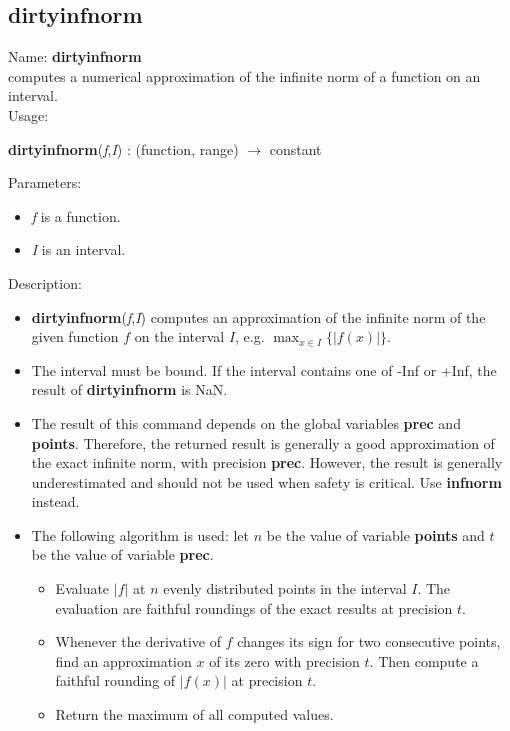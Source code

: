 \subsection{ dirtyinfnorm }
\noindent Name: \textbf{dirtyinfnorm}\\
computes a numerical approximation of the infinite norm of a function on an interval.\\

\noindent Usage: 
\begin{center}
\textbf{dirtyinfnorm}(\emph{f},\emph{I}) : (\textsf{function}, \textsf{range}) $\rightarrow$ \textsf{constant}\\
\end{center}
Parameters: 
\begin{itemize}
\item \emph{f} is a function.
\item \emph{I} is an interval.
\end{itemize}
\noindent Description: \begin{itemize}

\item \textbf{dirtyinfnorm}(\emph{f},\emph{I}) computes an approximation of the infinite norm of the 
   given function $f$ on the interval $I$, e.g. $\max_{x \in I} \{|f(x)|\}$.

\item The interval must be bound. If the interval contains one of -Inf or +Inf, the 
   result of \textbf{dirtyinfnorm} is NaN.

\item The result of this command depends on the global variables \textbf{prec} and \textbf{points}.
   Therefore, the returned result is generally a good approximation of the exact
   infinite norm, with precision \textbf{prec}. However, the result is generally 
   underestimated and should not be used when safety is critical.
   Use \textbf{infnorm} instead.

\item The following algorithm is used: let $n$ be the value of variable \textbf{points}
   and $t$ be the value of variable \textbf{prec}.
   \begin{itemize}
   \item  Evaluate $|f|$ at $n$ evenly distributed points in the
     interval $I$. The evaluation are faithful roundings of the exact
     results at precision $t$.
   \item  Whenever the derivative of $f$ changes its sign for two consecutive 
     points, find an approximation $x$ of its zero with precision $t$.
     Then compute a faithful rounding of $|f(x)|$ at precision $t$.
   \item  Return the maximum of all computed values.
   \end{itemize}
\end{itemize}
